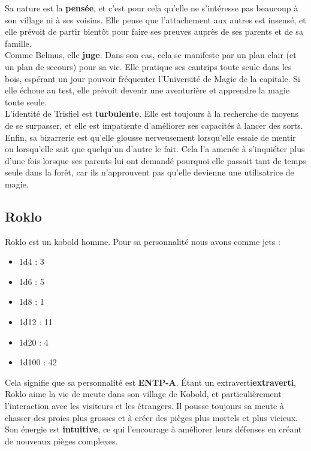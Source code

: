 \documentclass{article}
\begin{document}
Sa nature est la \textbf{pensée}, et c'est pour cela qu'elle ne s'intéresse pas beaucoup à son village ni à ses voisins. Elle pense que l'attachement aux autres est insensé, et elle prévoit de partir bientôt pour faire ses preuves auprès de ses parents et de sa famille.\\

Comme Belmus, elle \textbf{juge}. Dans son cas, cela se manifeste par un plan clair (et un plan de secours) pour sa vie. Elle pratique ses cantrips toute seule dans les bois, espérant un jour pouvoir fréquenter l'Université de Magie de la capitale. Si elle échoue au test, elle prévoit devenir une aventurière et apprendre la magie toute seule.\\

L'identité de Trisfiel est \textbf{turbulente}. Elle est toujours à la recherche de moyens de se surpasser, et elle est impatiente d'améliorer ses capacités à lancer des sorts.\\

Enfin, sa bizarrerie est qu'elle glousse nerveusement lorsqu'elle essaie de mentir ou lorsqu'elle sait que quelqu'un d'autre le fait. Cela l'a amenée à s'inquiéter plus d'une fois lorsque ses parents lui ont demandé pourquoi elle passait tant de temps seule dans la forêt, car ils n'approuvent pas qu'elle devienne une utilisatrice de magie.


\subsection{Roklo}
Roklo est un kobold homme. Pour sa personnalité nous avons comme jets :
\begin{itemize}
	\item 1d4 : 3
	\item 1d6 : 5
	\item 1d8 : 1
	\item 1d12 : 11
	\item 1d20 : 4
	\item 1d100 : 42
\end{itemize}

Cela signifie que sa personnalité est \textbf{ENTP-A}. Étant un extraverti\textbf{extraverti}, Roklo aime la vie de meute dans son village de Kobold, et particulièrement l'interaction avec les visiteurs et les étrangers. Il pousse toujours sa meute à chasser des proies plus grosses et à créer des pièges plus mortels et plus vicieux. Son énergie est \textbf{intuitive}, ce qui l'encourage à améliorer leurs défenses en créant de nouveaux pièges complexes.\\
\end{document}
